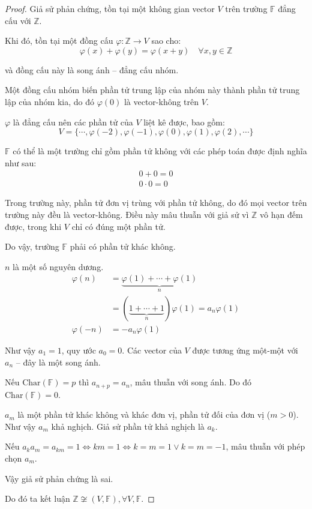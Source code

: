 \documentclass[class=linearalgebra,crop=false]{standalone}
\begin{document}
\begin{proof}Giả sử phản chứng, tồn tại một không gian vector $V$ trên trường $\mathbb{F}$ đẳng cấu với $\mathbb{Z}$.
    \par Khi đó, tồn tại một đồng cấu $\varphi: \mathbb{Z}\rightarrow V$ sao cho:
    \[ \varphi(x) + \varphi(y) = \varphi(x + y)\quad\forall x, y\in\mathbb{Z} \]
    \par và đồng cấu này là song ánh -- đẳng cấu nhóm.
    \par Một đồng cấu nhóm biến phần tử trung lập của nhóm này thành phần tử trung lập của nhóm kia, do đó $\varphi(0)$ là vector-không trên $V$.
    \par $\varphi$ là đẳng cấu nên các phần tử của $V$ liệt kê được, bao gồm:
    \[ V = \{ \cdots, \varphi(-2), \varphi(-1), \varphi(0), \varphi(1), \varphi(2), \cdots \} \]
    \par $\mathbb{F}$ có thể là một trường chỉ gồm phần tử không với các phép toán được định nghĩa như sau:
    \begin{align*}
        0 + 0 = 0 \\
        0\cdot 0 = 0
    \end{align*}
    \par Trong trường này, phần tử đơn vị trùng với phần tử không, do đó mọi vector trên trường này đều là vector-không. Điều này mâu thuẫn với giả sử vì $\mathbb{Z}$ vô hạn đếm được, trong khi $V$ chỉ có đúng một phần tử.
    \par Do vậy, trường $\mathbb{F}$ phải có phần tử khác không.
    \par $n$ là một số nguyên dương.
    \begin{align*}
        \varphi(n)&=\underbrace{\varphi(1) + \cdots + \varphi(1)}_{n} \\
                  &=(\underbrace{1 + \cdots + 1}_{n})\varphi(1) =a_{n}\varphi(1) \\
        \varphi(-n)&=-a_{n}\varphi(1)
    \end{align*}
    \par Như vậy $a_{1} = 1$, quy ước $a_{0} = 0$. Các vector của $V$ được tương ứng một-một với $a_{n}$ -- đây là một song ánh.
    \par Nếu $\text{Char}(\mathbb{F}) = p$ thì $a_{n + p} = a_{n}$, mâu thuẫn với song ánh. Do đó $\text{Char}(\mathbb{F}) = 0$.
    \par $a_{m}$ là một phần tử khác không và khác đơn vị, phần tử đối của đơn vị ($m > 0$). Như vậy $a_{m}$ khả nghịch. Giả sử phần tử khả nghịch là $a_{k}$.
    \par Nếu $a_{k}a_{m} = a_{km} = 1 \Leftrightarrow km = 1 \Leftrightarrow k = m = 1 \vee k = m = -1$, mâu thuẫn với phép chọn $a_{m}$.
    \par Vậy giả sử phản chứng là sai.
    \par Do đó ta kết luận $\mathbb{Z}\not\cong (V, \mathbb{F}), \forall V, \mathbb{F}$.
\end{proof}
\end{document}

